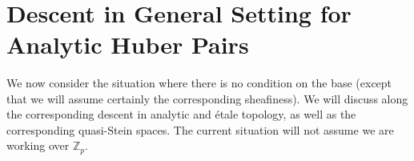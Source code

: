 \documentclass[12pt]{amsart}
\theoremstyle{definition}
\newtheorem{definition}[theorem]{Definition}
\numberwithin{equation}{section}
\newtheorem{setting}[theorem]{Setting}
\begin{document}
\





%
%
%
%
%
%
%
%
%
%
%
%
%
%
%
%



\section{Descent in General Setting for Analytic Huber Pairs}

\noindent We now consider the situation where there is no condition on the base (except that we will assume certainly the corresponding sheafiness). We will discuss along \cite{Ked1} the corresponding descent in analytic and \'etale topology, as well as the corresponding quasi-Stein spaces. The current situation will not assume we are working over $\mathbb{Z}_p$.
\end{document}
